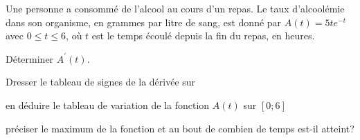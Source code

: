 \documentclass[11pt,a4paper]{article}  %
\begin{document}
%
%
%
%


Une personne a consommé de l'alcool au cours d'un repas. Le taux d'alcoolémie dans son organisme, en grammes par litre de sang, est donné par $A(t)=5 t e^{-t}$ avec $0 \leqslant t \leqslant 6$, où $t$ est le temps écoulé depuis la fin du repas, en heures.
\begin{enumMet}
	\item Déterminer $A^{\prime}(t)$.
	\item Dresser le tableau de signes de la dérivée sur \R
	\item en déduire le tableau de variation de la fonction $A(t)$ sur $[0;6]$
	\item préciser le maximum de la fonction et au bout de combien de temps est-il atteint?
\end{enumMet}


\end{document}
